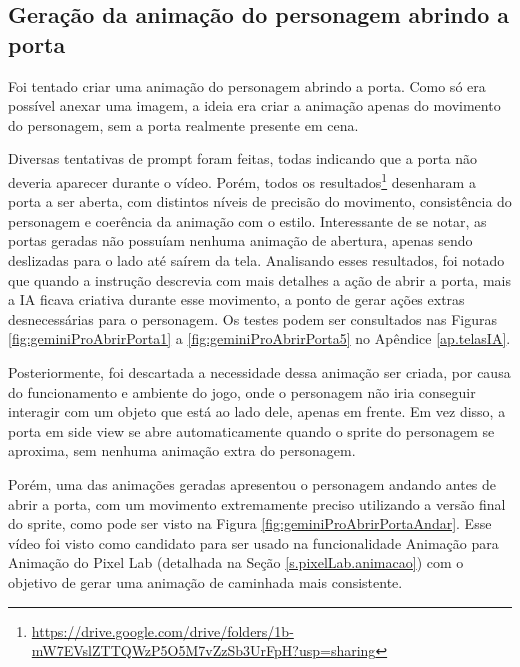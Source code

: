 \FloatBarrier
\subsection{Geração da animação do personagem abrindo a porta}
\label{s.gemini.animacaoAbrirPorta}

Foi tentado criar uma animação do personagem abrindo a porta. Como só era possível anexar uma imagem, a ideia era criar a animação apenas do movimento do personagem, sem a porta realmente presente em cena. 

Diversas tentativas de prompt foram feitas, todas indicando que a porta não deveria aparecer durante o vídeo. Porém, todos os resultados\footnote{\url{https://drive.google.com/drive/folders/1b-mW7EVslZTTQWzP5O5M7vZzSb3UrFpH?usp=sharing}} desenharam a porta a ser aberta, com distintos níveis de precisão do movimento, consistência do personagem e coerência da animação com o estilo. Interessante de se notar, as portas geradas não possuíam nenhuma animação de abertura, apenas sendo deslizadas para o lado até saírem da tela. Analisando esses resultados, foi notado que quando a instrução descrevia com mais detalhes a ação de abrir a porta, mais a IA ficava criativa durante esse movimento, a ponto de gerar ações extras desnecessárias para o personagem. Os testes podem ser consultados nas Figuras \ref{fig:geminiProAbrirPorta1} a \ref{fig:geminiProAbrirPorta5} no Apêndice \ref{ap.telasIA}.

Posteriormente, foi descartada a necessidade dessa animação ser criada, por causa do funcionamento e ambiente do jogo, onde o personagem não iria conseguir interagir com um objeto que está ao lado dele, apenas em frente. Em vez disso, a porta em side view se abre automaticamente quando o sprite do personagem se aproxima, sem nenhuma animação extra do personagem.

Porém, uma das animações geradas apresentou o personagem andando antes de abrir a porta, com um movimento extremamente preciso utilizando a versão final do sprite, como pode ser visto na Figura \ref{fig:geminiProAbrirPortaAndar}. Esse vídeo foi visto como candidato para ser usado na funcionalidade Animação para Animação do Pixel Lab (detalhada na Seção \ref{s.pixelLab.animacao}) com o objetivo de gerar uma animação de caminhada mais consistente.  

